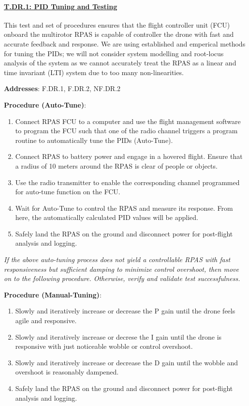 \paragraph{\underline{T.DR.1: PID Tuning and Testing}}

This test and set of procedures ensures that the flight controller unit (FCU) onboard the multirotor RPAS is capable of controller the drone with fast and accurate feedback and response. We are using established and emperical methods for tuning the PIDs; we will not consider system modelling and root-locus analysis of the system as we cannot accurately treat the RPAS as a linear and time invariant (LTI) system due to too many non-linearities.

\textbf{Addresses}: F.DR.1, F.DR.2, NF.DR.2

\textbf{Procedure (Auto-Tune)}:
\begin{enumerate}[noitemsep]
    \item Connect RPAS FCU to a computer and use the flight management software to program the FCU such that one of the radio channel triggers a program routine to automatically tune the PIDs (Auto-Tune).
    \item Connect RPAS to battery power and engage in a hovered flight. Ensure that a radius of 10 meters around the RPAS is clear of people or objects.
    \item Use the radio transmitter to enable the corresponding channel programmed for auto-tune function on the FCU.
    \item Wait for Auto-Tune to control the RPAS and measure its response. From here, the automatically calculated PID values will be applied.
    \item Safely land the RPAS on the ground and disconnect power for post-flight analysis and logging.
\end{enumerate}

\textit{If the above auto-tuning process does not yield a controllable RPAS with fast responsiveness but sufficient damping to minimize control overshoot, then move on to the following procedure. Otherwise, verify and validate test successfulness.}

\textbf{Procedure (Manual-Tuning)}:
\begin{enumerate}[noitemsep]
    \item Slowly and iteratively increase or decrease the P gain until the drone feels agile and responsive.
    \item Slowly and iteratively increase or decrese the I gain until the drone is responsive with just noticeable wobble or control overshoot.
    \item Slowly and iteratively increase or decrease the D gain until the wobble and overshoot is reasonably dampened.
    \item Safely land the RPAS on the ground and disconnect power for post-flight analysis and logging.
\end{enumerate}

